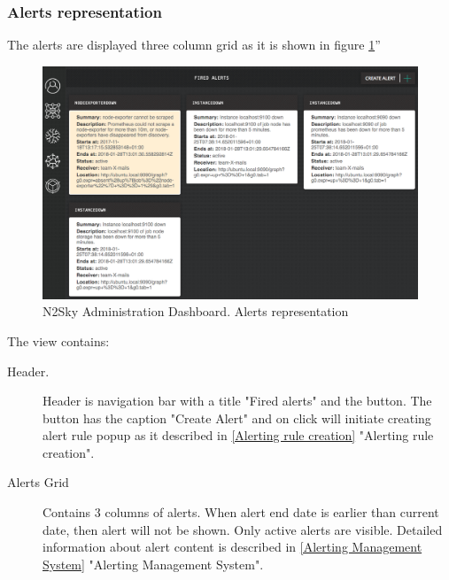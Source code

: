 \subsubsection{Alerts representation}\label{Alerts representation}

The alerts are displayed three column grid as it is shown in figure \ref{fig:alert_representation}'' 

\begin{figure}[htbp]
\begin{center}
  \includegraphics[width=\linewidth]{components/4/pics/alert_representation.png}
  \caption{N2Sky Administration Dashboard. Alerts representation}
  \label{fig:alert_representation}
\end{center}
\end{figure}

The view contains:

\begin{description}
\item[Header.] Header is navigation bar with a title "Fired alerts" and the button. The button has the caption "Create Alert" and on click will initiate creating alert rule popup as it described in \autoref{Alerting rule creation} "Alerting rule creation".
\item[Alerts Grid] Contains 3 columns of alerts. When alert end date is earlier than current date, then alert will not be shown. Only active alerts are visible. Detailed information about alert content is described in \autoref{Alerting Management System} "Alerting Management System".
\end{description}



